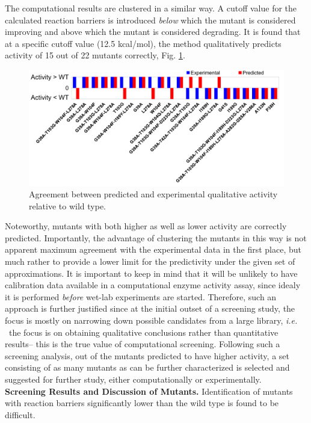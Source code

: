 The computational results are clustered in a similar way.
A cutoff value for the calculated reaction barriers is introduced \textit{below} which the mutant is considered improving and above which the mutant is considered degrading.
It is found that at a specific cutoff value (12.5 kcal/mol), the method qualitatively predicts activity of 15 out of 22 mutants correctly, Fig. \ref{fig:diag-predictivity}.
\begin{figure}[htbp] 
\includegraphics[width=1.00\linewidth]{diag-predictivity-truncated.pdf}
\caption{
Agreement between predicted and experimental qualitative activity relative to wild type\cite{hediger2013silico}.
}
\label{fig:diag-predictivity}
\end{figure}
Noteworthy, mutants with both higher as well as lower activity are correctly predicted.
Importantly, the advantage of clustering the mutants in this way is not apparent maximum agreement with the experimental data in the first place, but much rather to provide a lower limit for the predictivity under the given set of approximations.
It is important to keep in mind that it will be unlikely to have calibration data available in a computational enzyme activity assay, since idealy it is performed \textit{before} wet-lab experiments are started.
Therefore, such an approach is further justified since at the initial outset of a screening study, the focus is mostly on narrowing down possible candidates from a large library, \textit{i.e. } the focus is on obtaining qualitative conclusions rather than quantitative results\cite{agresti2010ultrahigh}-- this is the true value of computational screening.
Following such a screening analysis, out of the mutants predicted to have higher activity, a set consisting of as many mutants as can be further characterized is selected and suggested for further study, either computationally or experimentally.\\
\textbf{Screening Results and Discussion of Mutants.}
Identification of mutants with reaction barriers significantly lower than the wild type is found to be difficult.
